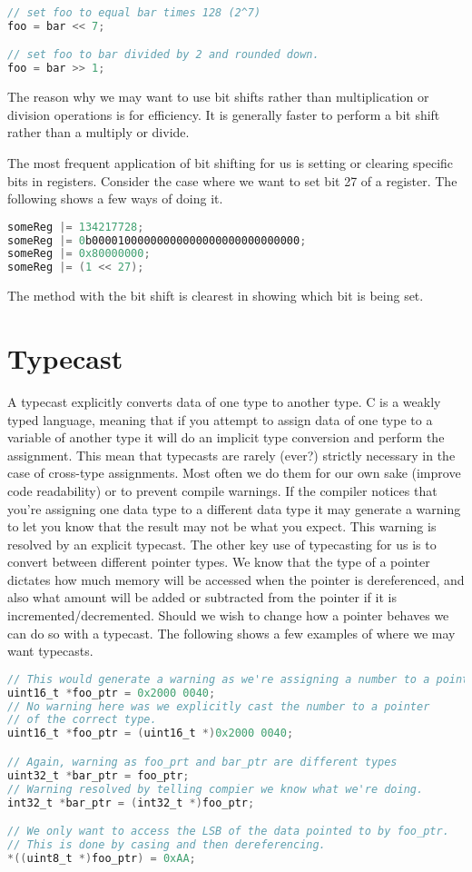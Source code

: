 \begin{lstlisting}[language=C]
// set foo to equal bar times 128 (2^7)
foo = bar << 7;

// set foo to bar divided by 2 and rounded down.
foo = bar >> 1;
\end{lstlisting}

The reason why we may want to use bit shifts rather than multiplication or division operations is for efficiency. It is generally faster to perform a bit shift rather than a multiply or divide. 

The most frequent application of bit shifting for us is setting or clearing specific bits in registers. Consider the case where we want to set bit 27 of a register. The following shows a few ways of doing it.

\begin{lstlisting}[language=C]
someReg |= 134217728;
someReg |= 0b00001000000000000000000000000000;
someReg |= 0x80000000;
someReg |= (1 << 27);
\end{lstlisting}

The method with the bit shift is clearest in showing which bit is being set. 

\section{Typecast}
A typecast explicitly converts data of one type to another type. 
C is a weakly typed language, meaning that if you attempt to assign data of one type to a variable of another type it will do an implicit type conversion and perform the assignment.
This mean that typecasts are rarely (ever?) strictly necessary in the case of cross-type assignments.
Most often we do them for our own sake (improve code readability) or to prevent compile warnings.
If the compiler notices that you're assigning one data type to a different data type it may generate a warning to let you know that the result may not be what you expect.
This warning is resolved by an explicit typecast. 
The other key use of typecasting for us is to convert between different pointer types.
We know that the type of a pointer dictates how much memory will be accessed when the pointer is dereferenced, and also what amount will be added or subtracted from the pointer if it is incremented/decremented. 
Should we wish to change how a pointer behaves we can do so with a typecast. 
The following shows a few examples of where we may want typecasts.

\begin{lstlisting}[language=C]
// This would generate a warning as we're assigning a number to a pointer
uint16_t *foo_ptr = 0x2000 0040;
// No warning here was we explicitly cast the number to a pointer
// of the correct type.
uint16_t *foo_ptr = (uint16_t *)0x2000 0040;

// Again, warning as foo_prt and bar_ptr are different types
uint32_t *bar_ptr = foo_ptr;
// Warning resolved by telling compier we know what we're doing.
int32_t *bar_ptr = (int32_t *)foo_ptr;

// We only want to access the LSB of the data pointed to by foo_ptr.
// This is done by casing and then dereferencing.
*((uint8_t *)foo_ptr) = 0xAA;
\end{lstlisting}
